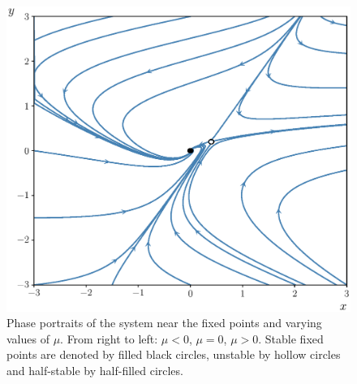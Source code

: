 \documentclass{article}
\begin{document}
\begin{figure}
	\begin{center}
	\includegraphics[scale=0.5]{Exam_Q_Phase_Portrait_Large_Mu.eps}
	\end{center}
	\caption{Phase portraits of the system near the fixed points and varying values of $\mu$. 
	From right to left: $\mu < 0$, $\mu = 0$, $\mu > 0$. Stable fixed points are 
	denoted by filled black circles, unstable by hollow circles and half-stable by half-filled 
	circles.}
    \label{fig:exam_phase portraits}
\end{figure}
\end{document}
